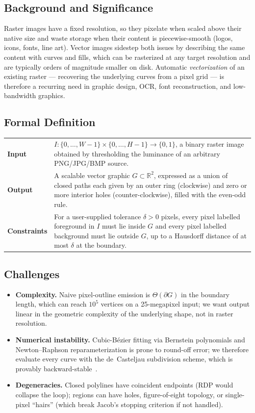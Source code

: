 \documentclass[twocolumn,a4paper,10pt]{article}
\begin{document}
\subsection{Background and Significance}
Raster images have a fixed resolution, so they pixelate when scaled
above their native size and waste storage when their content is
piecewise-smooth (logos, icons, fonts, line art).  Vector images
sidestep both issues by describing the same content with curves and
fills, which can be rasterized at any target resolution and are
typically orders of magnitude smaller on disk.  Automatic
\emph{vectorization} of an existing raster --- recovering the
underlying curves from a pixel grid --- is therefore a recurring need
in graphic design, OCR, font reconstruction, and low-bandwidth
graphics.

\subsection{Formal Definition}
\noindent\begin{tabular}{@{}p{}p{}@{}}
\toprule
\textbf{Input}      &
   $I : \{0,\dots,W{-}1\}\times\{0,\dots,H{-}1\} \to \{0,1\}$, a binary
   raster image obtained by thresholding the luminance of an arbitrary
   PNG/JPG/BMP source. \\
\textbf{Output}     &
   A scalable vector graphic $G \subset \mathbb{R}^2$, expressed as a
   union of closed paths each given by an outer ring (clockwise) and
   zero or more interior holes (counter-clockwise), filled with the
   even-odd rule. \\
\textbf{Constraints} &
   For a user-supplied tolerance $\delta>0$ pixels, every pixel
   labelled foreground in $I$ must lie inside $G$ and every pixel
   labelled background must lie outside $G$, up to a Hausdorff
   distance of at most $\delta$ at the boundary. \\ \bottomrule
\end{tabular}

\subsection{Challenges}
\begin{itemize}
\item \textbf{Complexity.}  Naive pixel-outline emission is
      $\Theta(\partial G)$ in the boundary length, which can reach
      $10^5$ vertices on a 25-megapixel input; we want output linear
      in the geometric complexity of the underlying shape, not in
      raster resolution.
\item \textbf{Numerical instability.}  Cubic-B\'ezier fitting via
      Bernstein polynomials and Newton--Raphson reparameterization is
      prone to round-off error; we therefore evaluate every curve
      with the de~Casteljau subdivision scheme, which is provably
      backward-stable~\cite{farouki2012}.
\item \textbf{Degeneracies.}  Closed polylines have coincident
      endpoints (RDP would collapse the loop); regions can have
      holes, figure-of-eight topology, or single-pixel ``hairs''
      (which break Jacob's stopping criterion if not handled).
\end{itemize}
\end{document}
